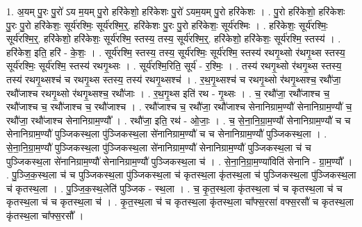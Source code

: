 \documentclass[17pt]{extarticle}
\begin{document}
1. अ॒यम् पु॒रः पु॒रो॑ ऽय म॒यम् पु॒रो हरि॑केशो॒ हरि॑केशः पु॒रो॑ ऽयम॒यम् पु॒रो हरि॑केशः । . पु॒रो हरि॑केशो॒ हरि॑केशः पु॒रः पु॒रो हरि॑केशः॒ सूर्य॑रश्मिः॒ सूर्य॑रश्मि॒र्॒. हरि॑केशः पु॒रः पु॒रो हरि॑केशः॒ सूर्य॑रश्मिः । . हरि॑केशः॒ सूर्य॑रश्मिः॒ सूर्य॑रश्मि॒र्॒. हरि॑केशो॒ हरि॑केशः॒ सूर्य॑रश्मि॒ स्तस्य॒ तस्य॒ सूर्य॑रश्मि॒र्॒. हरि॑केशो॒ हरि॑केशः॒ सूर्य॑रश्मि॒ स्तस्य॑ । . हरि॑केश॒ इति॒ हरि॑ - के॒शः॒ । . सूर्य॑रश्मि॒ स्तस्य॒ तस्य॒ सूर्य॑रश्मिः॒ सूर्य॑रश्मि॒ स्तस्य॑ रथगृ॒थ्सो र॑थगृ॒थ्स स्तस्य॒ सूर्य॑रश्मिः॒ सूर्य॑रश्मि॒ स्तस्य॑ रथगृ॒थ्सः । . सूर्य॑रश्मि॒रिति॒ सूर्य॑ - र॒श्मिः॒ । . तस्य॑ रथगृ॒थ्सो र॑थगृ॒थ्स स्तस्य॒ तस्य॑ रथगृ॒थ्सश्च॑ च रथगृ॒थ्स स्तस्य॒ तस्य॑ रथगृ॒थ्सश्च॑ । . र॒थ॒गृ॒थ्सश्च॑ च रथगृ॒थ्सो र॑थगृ॒थ्सश्च॒ रथौ॑जा॒ रथौ॑जाश्च रथगृ॒थ्सो र॑थगृ॒थ्सश्च॒ रथौ॑जाः । . र॒थ॒गृ॒थ्स इति॑ रथ - गृ॒थ्सः । . च॒ रथौ॑जा॒ रथौ॑जाश्च च॒ रथौ॑जाश्च च॒ रथौ॑जाश्च च॒ रथौ॑जाश्च । . रथौ॑जाश्च च॒ रथौ॑जा॒ रथौ॑जाश्च सेनानिग्राम॒ण्यौ॑ सेनानिग्राम॒ण्यौ॑ च॒ रथौ॑जा॒ रथौ॑जाश्च सेनानिग्राम॒ण्यौ᳚ । . रथौ॑जा॒ इति॒ रथ॑ - ओ॒जाः॒ । . च॒ से॒ना॒नि॒ग्रा॒म॒ण्यौ॑ सेनानिग्राम॒ण्यौ॑ च च सेनानिग्राम॒ण्यौ॑ पुञ्जिकस्थ॒ला पु॑ञ्जिकस्थ॒ला से॑नानिग्राम॒ण्यौ॑ च च सेनानिग्राम॒ण्यौ॑ पुञ्जिकस्थ॒ला । . से॒ना॒नि॒ग्रा॒म॒ण्यौ॑ पुञ्जिकस्थ॒ला पु॑ञ्जिकस्थ॒ला से॑नानिग्राम॒ण्यौ॑ सेनानिग्राम॒ण्यौ॑ पुञ्जिकस्थ॒ला च॑ च पुञ्जिकस्थ॒ला से॑नानिग्राम॒ण्यौ॑ सेनानिग्राम॒ण्यौ॑ पुञ्जिकस्थ॒ला च॑ । . से॒ना॒नि॒ग्रा॒म॒ण्या॑विति॑ सेनानि - ग्रा॒म॒ण्यौ᳚ । . पु॒ञ्जि॒क॒स्थ॒ला च॑ च पुञ्जिकस्थ॒ला पु॑ञ्जिकस्थ॒ला च॑ कृतस्थ॒ला कृ॑तस्थ॒ला च॑ पुञ्जिकस्थ॒ला पु॑ञ्जिकस्थ॒ला च॑ कृतस्थ॒ला । . पु॒ञ्जि॒क॒स्थ॒लेति॑ पुञ्जिक - स्थ॒ला । . च॒ कृ॒त॒स्थ॒ला कृ॑तस्थ॒ला च॑ च कृतस्थ॒ला च॑ च कृतस्थ॒ला च॑ च कृतस्थ॒ला च॑ । . कृ॒त॒स्थ॒ला च॑ च कृतस्थ॒ला कृ॑तस्थ॒ला चा᳚फ्स॒रसा॑ वफ्स॒रसौ॑ च कृतस्थ॒ला कृ॑तस्थ॒ला चा᳚फ्स॒रसौ᳚ । \newline
\end{document}
